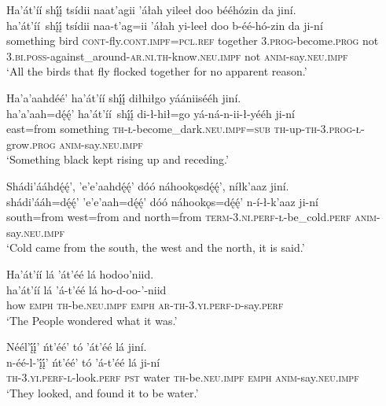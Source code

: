 \ea\label{ex:text4-2-8}
Ha’át’íí shį́į́ tsídii naat’agii ’áłah yileeł doo bééhózin da jiní.\\
\gll ha’át’íí~{shį́į́}	tsídii	naa-t’ag=ii	’áłah	yi-leeł	doo	b-éé-hó-zin	da	ji-ní\\
     something	bird	\textsc{cont}-fly.\textsc{cont}.\textsc{impf}=\textsc{pcl}.\textsc{ref}	together	3.\textsc{prog}-become.\textsc{prog}	not	3.\textsc{bi}.\textsc{poss}-against\_around-\textsc{ar}.\textsc{ni}.\textsc{th}-know.\textsc{neu}.\textsc{impf}	not	\textsc{anim}-say.\textsc{neu}.\textsc{impf}\\
\glt `All the birds that fly flocked together for no apparent reason.'
\z

\ea\label{ex:text4-2-9}
Ha’a’aahdéé’ ha’át’íí shį́į́ diłhiłgo yáániisééh jiní.\\
\gll ha’a’aah=dę́ę́’	ha’át’íí~{shį́į́}	di-ł-hił=go	yá-ná-n-ii-ł-yééh	ji-ní\\
     east=from	something	\textsc{th}-\textsc{ł}-become\_dark.\textsc{neu}.\textsc{impf}=\textsc{sub}	\textsc{th}-up-\textsc{th}-3.\textsc{prog}-\textsc{ł}-grow.\textsc{prog}	\textsc{anim}-say.\textsc{neu}.\textsc{impf}\\
\glt `Something black kept rising up and receding.'
\z

\ea\label{ex:text4-2-10}
Shádi’ááhdę́ę́’, ’e’e’aahdę́ę́’ dóó náhookǫsdę́ę́’, níłk’aaz jiní.\\
\gll shádi’ááh=dę́ę́’	’e’e’aah=dę́ę́’	dóó	náhookǫs=dę́ę́’	n-í-ł-k’aaz	ji-ní\\
     south=from	west=from	and	north=from	\textsc{term}-3.\textsc{ni}.\textsc{perf}-\textsc{ł}-be\_cold.\textsc{perf}	\textsc{anim}-say.\textsc{neu}.\textsc{impf}\\
\glt `Cold came from the south, the west and the north, it is said.'
\z

\ea\label{ex:text4-2-11}
Ha’át’íí lá ’át’éé lá hodoo’niid.\\
\gll ha’át’íí	lá	’á-t’éé	lá	ho-d-oo-’-niid\\
     how	\textsc{emph}	\textsc{th}-be.\textsc{neu}.\textsc{impf}	\textsc{emph}	\textsc{ar}-\textsc{th}-3.\textsc{yi}.\textsc{perf}-\textsc{d}-say.\textsc{perf}\\
\glt `The People wondered what it was.'
\z

\ea\label{ex:text4-2-12}
Néél’į́į́’ ńt’éé’ tó ’át’éé lá jiní.\\
\gll n-éé-l-’į́į́’	ńt’éé’	tó	’á-t’éé	lá	ji-ní\\
     \textsc{th}-3.\textsc{yi}.\textsc{perf}-\textsc{l}-look.\textsc{perf}	\textsc{pst}	water	\textsc{th}-be.\textsc{neu}.\textsc{impf}	\textsc{emph}	\textsc{anim}-say.\textsc{neu}.\textsc{impf}\\
\glt `They looked, and found it to be water.'
\z

